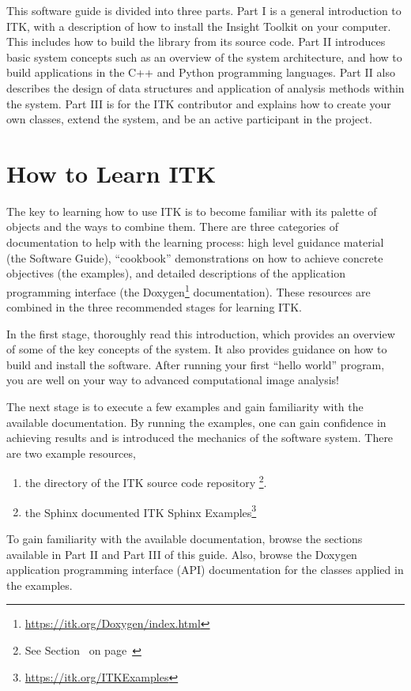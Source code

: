 This software guide is divided into three parts. Part I is a general
introduction to ITK, with a description of how to install the Insight
Toolkit on your computer. This includes how to build the library from its
source code. Part II introduces basic system concepts such as an overview of
the system architecture, and how to build applications in the C++ and Python
programming languages. Part II also describes the design of data structures
and application of analysis methods within the system.  Part III is for the
ITK contributor and explains how to create your own classes, extend the
system, and be an active participant in the project.

\section{How to Learn ITK}%
\label{sec:HowToLearnITK}

The key to learning how to use ITK is to become familiar with its palette of
objects and the ways to combine them. There are three categories of
documentation to help with the learning process: high level guidance material
(the Software Guide), ``cookbook'' demonstrations on how to achieve concrete
objectives (the examples), and detailed descriptions of the
application programming interface (the
Doxygen\footnote{\url{https://itk.org/Doxygen/index.html}} documentation). These
resources are combined in the three recommended stages for learning ITK.

In the first stage, thoroughly read this introduction, which provides an
overview of some of the key concepts of the system. It also provides guidance
on how to build and install the software. After running your first ``hello
world'' program, you are well on your way to advanced computational image
analysis!

The next stage is to execute a few examples and gain familiarity with the
available documentation. By running the examples, one can gain confidence
in achieving results and is introduced the mechanics of the software system.
There are two example resources,
\begin{enumerate}
  \item the  directory of the ITK source code repository%
  \footnote{See Section~ on
  page~\pageref{sec:DownloadingITK}}.
  \item the Sphinx documented ITK Sphinx Examples\footnote{\url{https://itk.org/ITKExamples}}
\end{enumerate}
To gain familiarity with the available documentation, browse the sections
available in Part II and Part III of this guide. Also, browse the Doxygen
application programming interface (API) documentation for the classes applied
in the examples.

